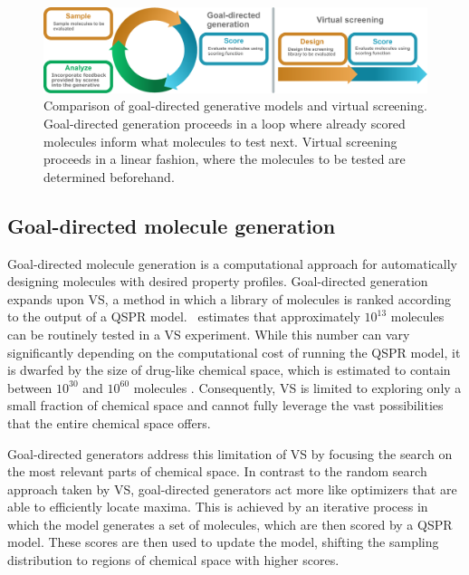 \begin{figure}
      \centering
      \includegraphics[width=\textwidth]{./figures/goal_directed_cycle_and_virtual_screening.pdf}
      \caption{Comparison of goal-directed generative models and virtual screening. Goal-directed
            generation proceeds in a loop where already scored molecules inform what molecules to test next.
            Virtual screening proceeds in a linear fashion, where the molecules to be tested are determined
            beforehand. }
\end{figure}


\subsection{Goal-directed molecule generation}
Goal-directed molecule generation \citep{schneiderNovoMolecularDesign2013} is a computational
approach for automatically designing molecules with desired property profiles. Goal-directed
generation expands upon \ac{VS}, a method in which a library of molecules is ranked according to the
output of a \ac{QSPR} model.\ \citet{waltersVirtualChemicalLibraries2019} estimates that
approximately $10^{13}$ molecules can be routinely tested in a \ac{VS} experiment. While this number
can vary significantly depending on the computational cost of running the \ac{QSPR} model, it is
dwarfed by the size of drug-like chemical space, which is estimated to contain between $10^{30}$ and
$10^{60}$ molecules \citep{waltersVirtualChemicalLibraries2019,ruddigkeitEnumeration166Billion2012}.
Consequently, \ac{VS} is limited to exploring only a small fraction of chemical space and cannot
fully leverage the vast possibilities that the entire chemical space offers.

Goal-directed generators address this limitation of \ac{VS} by focusing the search on the most relevant
parts of chemical space. In contrast to the random search approach taken by \ac{VS}, goal-directed
generators act more like optimizers that are able to efficiently locate maxima. This is achieved by
an iterative process in which the model generates a set of molecules, which are then scored by a
\ac{QSPR} model. These scores are then used to update the model, shifting the sampling 
distribution to regions of chemical space with higher scores. 

